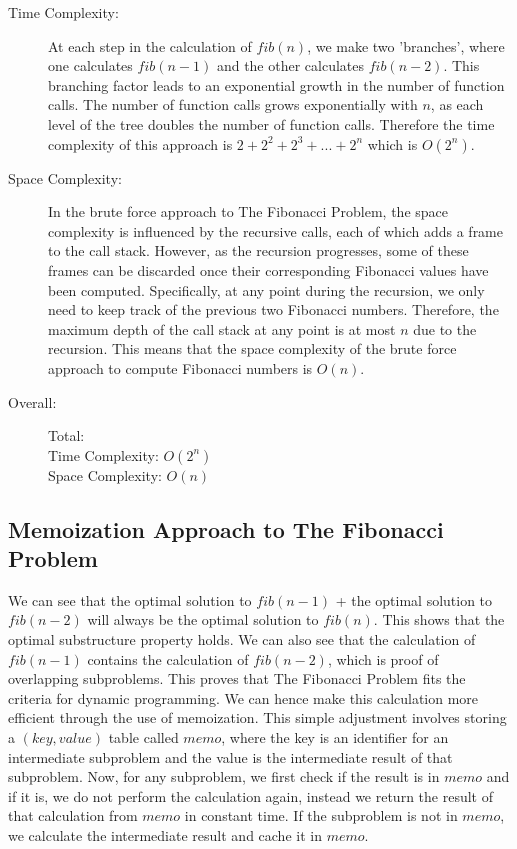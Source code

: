 \begin{description}
    \item[Time Complexity:]
    At each step in the calculation of $fib(n)$, we make two 'branches', where one calculates $fib(n-1)$ and the other calculates $fib(n-2)$.
    This branching factor leads to an exponential growth in the number of function calls.
    The number of function calls grows exponentially with $n$, as each level of the tree doubles the number of function calls.
    Therefore the time complexity of this approach is $2 + 2^2 + 2^3 + ... + 2^n$ which is $O(2^n)$.
        
    \item[Space Complexity:] 
        In the brute force approach to The Fibonacci Problem, the space complexity is influenced by the recursive calls, each of which adds a frame to the call stack. However, as the recursion progresses, some of these frames can be discarded once their corresponding Fibonacci values have been computed.
        Specifically, at any point during the recursion, we only need to keep track of the previous two Fibonacci numbers. Therefore, the maximum depth of the call stack at any point is at most $n$ due to the recursion.
        This means that the space complexity of the brute force approach to compute Fibonacci numbers is $O(n)$.
        
        
    \item[Overall:] Total:\\
        Time Complexity: $O(2^n)$\\
        Space Complexity: $O(n)$
        
\end{description}
\newpage

\subsection{Memoization Approach to The Fibonacci Problem}
We can see that the optimal solution to $fib(n-1)$ + the optimal solution to $fib(n-2)$ will always be the optimal solution to $fib(n)$. This shows that the optimal substructure property holds.
We can also see that the calculation of $fib(n-1)$ contains the calculation of $fib(n-2)$, which is proof of overlapping subproblems.
This proves that The Fibonacci Problem fits the criteria for dynamic programming.
We can hence make this calculation more efficient through the use of memoization.
This simple adjustment involves storing a $(key, value)$ table called $memo$, where the key is an identifier for an intermediate subproblem and the value is the intermediate result of that subproblem.
Now, for any subproblem, we first check if the result is in $memo$ and if it is, we do not perform the calculation again, instead we return the result of that calculation from $memo$ in constant time.
If the subproblem is not in $memo$, we calculate the intermediate result and cache it in $memo$.


